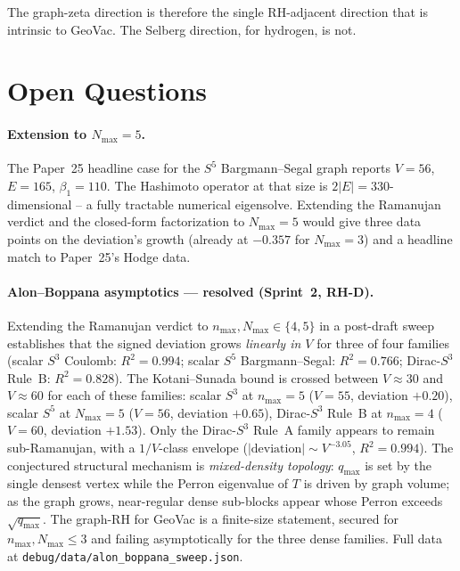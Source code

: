 \documentclass[11pt]{article}
\begin{document}
The graph-zeta direction is therefore the single RH-adjacent direction
that is intrinsic to GeoVac.  The Selberg direction, for hydrogen,
is not.

\section{Open Questions}
\label{sec:open_questions}

\paragraph{Extension to $N_{\max}=5$.}  The Paper~25 headline case
for the $S^5$ Bargmann--Segal graph reports $V=56$, $E=165$,
$\beta_1=110$.  The Hashimoto operator at that size is $2|E|=330$-dimensional
-- a fully tractable numerical eigensolve.  Extending the Ramanujan
verdict and the closed-form factorization to $N_{\max}=5$ would give
three data points on the deviation's growth (already at $-0.357$
for $N_{\max}=3$) and a headline match to Paper~25's Hodge data.

\paragraph{Alon--Boppana asymptotics --- resolved (Sprint~2, RH-D).}
Extending the Ramanujan verdict to $n_{\max},N_{\max}\in\{4,5\}$ in a
post-draft sweep establishes that the signed deviation grows
\emph{linearly in $V$} for three of four families (scalar $S^3$
Coulomb: $R^2=0.994$; scalar $S^5$ Bargmann--Segal: $R^2=0.766$;
Dirac-$S^3$ Rule~B: $R^2=0.828$).  The Kotani--Sunada bound is crossed
between $V\approx 30$ and $V\approx 60$ for each of these families:
scalar $S^3$ at $n_{\max}=5$ ($V=55$, deviation $+0.20$), scalar $S^5$
at $N_{\max}=5$ ($V=56$, deviation $+0.65$), Dirac-$S^3$ Rule~B at
$n_{\max}=4$ ($V=60$, deviation $+1.53$).  Only the Dirac-$S^3$ Rule~A
family appears to remain sub-Ramanujan, with a $1/V$-class envelope
($|\text{deviation}|\sim V^{-3.05}$, $R^2=0.994$).  The conjectured
structural mechanism is \emph{mixed-density topology}: $q_{\max}$ is
set by the single densest vertex while the Perron eigenvalue of $T$ is
driven by graph volume; as the graph grows, near-regular dense
sub-blocks appear whose Perron exceeds $\sqrt{q_{\max}}$.  The
graph-RH for GeoVac is a finite-size statement, secured for
$n_{\max},N_{\max}\le 3$ and failing asymptotically for the three
dense families.  Full data at \texttt{debug/data/alon\_boppana\_sweep.json}.
\end{document}
